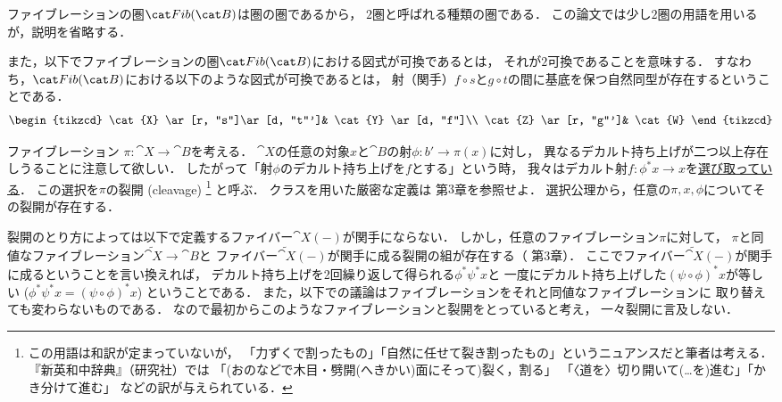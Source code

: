     \begin{Remark}
        ファイブレーションの圏$\Fib{B}$は圏の圏であるから，
        $2$圏と呼ばれる種類の圏である．
        この論文では少し$2$圏の用語を用いるが，説明を省略する．

        また，以下でファイブレーションの圏$\Fib{B}$における図式が可換であるとは，
        それが$2$可換であることを意味する．
        すなわち，$\Fib{B}$における以下のような図式が可換であるとは，
        射（関手）$f \circ s$と$g \circ t$の間に基底を保つ自然同型が存在するということである．
        \[
        \begin{tikzcd}
            \cat{X} \ar[r, "s"]\ar[d, "t"']& \cat{Y} \ar[d, "f"]\\
            \cat{Z} \ar[r, "g"']& \cat{W}
        \end{tikzcd}
        \]
    \end{Remark}

    \begin{Remark}\label{remark:cleavage}
        ファイブレーション $\pi \colon \cat{X} \to \cat{B}$を考える．
        $\cat{X}$の任意の対象$x$と$\cat{B}$の射$\phi \colon b' \to \pi(x)$に対し，
        異なるデカルト持ち上げが二つ以上存在しうることに注意して欲しい．
        したがって「射$\phi$のデカルト持ち上げを$f$とする」という時，
        我々はデカルト射$f \colon \phi^*x \to x$を\underline{選び取っている}．
        この選択を$\pi$の裂開 (cleavage)
        \footnote
        {
            この用語は和訳が定まっていないが，
            「力ずくで割ったもの」「自然に任せて裂き割ったもの」というニュアンスだと筆者は考える．
            『新英和中辞典』（研究社）では
            「(おのなどで木目・劈開(へきかい)面にそって)裂く，割る」
            「〈道を〉切り開いて(…を)進む」「かき分けて進む」
            などの訳が与えられている．
        }
        と呼ぶ．
        クラスを用いた厳密な定義は\cite{FGAexp} 第$3$章を参照せよ．
        選択公理から，任意の$\pi, x, \phi$についてその裂開が存在する．

        裂開のとり方によっては以下で定義するファイバー$\cat{X}(-)$が関手にならない．
        しかし，任意のファイブレーション$\pi$に対して，
        $\pi$と同値なファイブレーション$\tilde{\cat{X}} \to \cat{B}$と
        ファイバー$\tilde{\cat{X}}(-)$が関手に成る裂開の組が存在する（\cite{FGAexp} 第$3$章）．
        ここでファイバー$\tilde{\cat{X}}(-)$が関手に成るということを言い換えれば，
        デカルト持ち上げを2回繰り返して得られる$\phi^*\psi^*x$と
        一度にデカルト持ち上げした$(\psi \circ \phi)^*x$が等しい ($\phi^*\psi^*x=(\psi \circ \phi)^*x$)
        ということである．
        また，以下での議論はファイブレーションをそれと同値なファイブレーションに
        取り替えても変わらないものである．
        なので最初からこのようなファイブレーションと裂開をとっていると考え，
        一々裂開に言及しない．
    \end{Remark}

